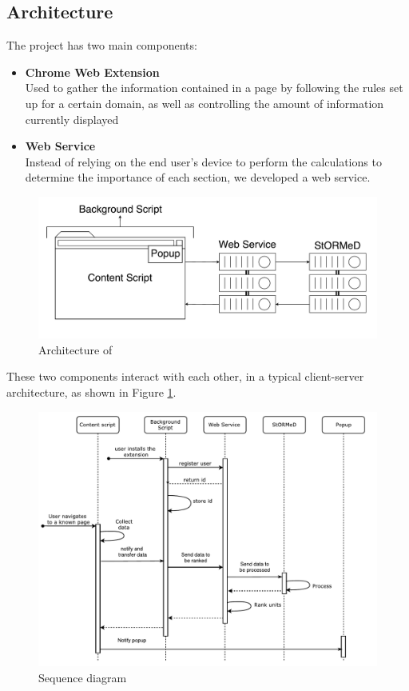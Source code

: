 \subsection{Architecture}\label{sec:architecture}
The project has two main components:
\begin{itemize}
\item \textbf{Chrome Web Extension}\\
Used to gather the information contained in a page by following the rules set up for a certain domain, as well as controlling the amount of information currently displayed
\item \textbf{Web Service}\\
Instead of relying on the end user's device to perform the calculations to determine the importance of each section, we developed a web service.
\end{itemize}

\begin{figure}[H]
\centering
\includegraphics[scale=0.4]{Figures/ArchitectureNoLabel}
\caption{Architecture of \projectName}
\label{fig:architecture}
\end{figure} 
These two components interact with each other, in a typical client-server architecture, as shown in Figure \ref{fig:architecture}.


\begin{figure}[H]
\centering
\includegraphics[scale=0.75]{Figures/SequenceDiagramAll}
\caption{Sequence diagram}
\label{fig:sequenceDiagram}
\end{figure}


